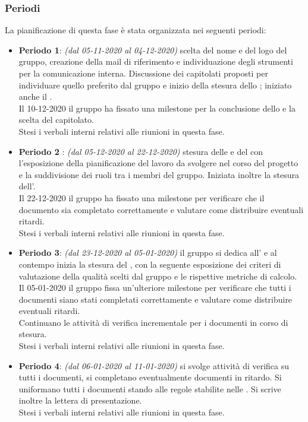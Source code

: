 \subsubsection{Periodi}
La pianificazione di questa fase è stata organizzata nei seguenti periodi:
\begin{itemize}
\item \textbf{Periodo 1}: \textit{(dal 05-11-2020 al 04-12-2020)} scelta del nome e del logo del gruppo, creazione della mail di riferimento e individuazione degli strumenti per la comunicazione interna. Discussione dei capitolati proposti per individuare quello preferito dal gruppo e inizio della stesura dello \SdF{}; iniziato anche il \Glossario. \\Il 10-12-2020 il gruppo ha fissato una milestone\glo{} per la conclusione dello \SdF{} e la scelta del capitolato.\\Stesi i verbali interni relativi alle riunioni in questa fase.
\item \textbf{Periodo 2 }: \textit{(dal 05-12-2020 al 22-12-2020)} stesura delle \NdP{} e del \PdP{} con l'esposizione della pianificazione del lavoro da svolgere nel corso del progetto e la suddivisione dei ruoli tra i membri del gruppo. Iniziata inoltre la stesura dell'\AdR{}.\\Il 22-12-2020 il gruppo ha fissato una milestone\glo{} per verificare che il documento \NdP{} sia completato correttamente e valutare come distribuire eventuali ritardi.\\Stesi i verbali interni relativi alle riunioni in questa fase.
\item \textbf{Periodo 3}: \textit{(dal 23-12-2020 al 05-01-2020)} il gruppo si dedica all'\AdR{} e al contempo inizia la stesura del \PdQ{}, con la seguente esposizione dei criteri di valutazione della qualità scelti dal gruppo e le rispettive metriche\glo{} di calcolo.\\Il 05-01-2020 il gruppo fissa un'ulteriore milestone\glo{} per verificare che tutti i documenti siano stati completati correttamente e valutare come distribuire eventuali ritardi.\\Continuano le attività di verifica incrementale per i documenti in corso di stesura.\\Stesi i verbali interni relativi alle riunioni in questa fase.
\item \textbf{Periodo 4}: \textit{(dal 06-01-2020 al 11-01-2020)} si svolge attività di verifica su tutti i documenti, si completano eventualmente documenti in ritardo. Si uniformano tutti i documenti stando alle regole stabilite nelle \NdP{}. Si scrive inoltre la lettera di presentazione.\\Stesi i verbali interni relativi alle riunioni in questa fase.
\end{itemize}

